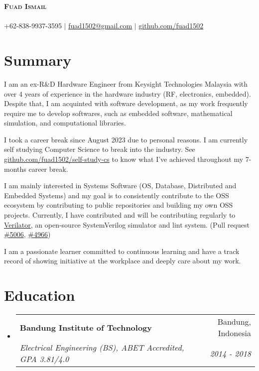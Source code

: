 \documentclass[letterpaper,11pt]{article}
\makeatletter
\newcommand{\resumeSubheading}[4]{
  \vspace{-2pt}\item
    \begin{tabular*}{0.97\textwidth}[t]{l@{\extracolsep{\fill}}r}
      \textbf{#1} & #2 \\
      \textit{\small#3} & \textit{\small #4} \\
    \end{tabular*}\vspace{-7pt}
}
\newcommand{\resumeSubHeadingListStart}{\begin{itemize}[leftmargin=0.15in, label={}]}
\newcommand{\resumeSubHeadingListEnd}{\end{itemize}}
\makeatother
\begin{document}
\begin{center}
  \textbf{\Huge \scshape Fuad Ismail} \\ \vspace{1pt}
  \small \textit{} \\
  +62-838-9937-3595 $|$ \href{mailto:fuad1502@gmail.com}{fuad1502@gmail.com} $|$ 
  \href{https://github.com/fuad1502}{github.com/fuad1502}
\end{center}

\section*{Summary}
\justifying
I am an ex-R\&D Hardware Engineer from Keysight Technologies Malaysia with over
4 years of experience in the hardware industry (RF, electronics, embedded).
Despite that, I am acquinted with software development, as my work frequently
require me to develop softwares, such as embedded software, mathematical
simulation, and computational libraries.

I took a career break since August 2023 due to personal reasons. I am currently
self studying Computer Science to break into the industry. See
\href{https://github.com/fuad1502/self-study-cs}{github.com/fuad1502/self-study-cs}
to know what I've achieved throughout my 7-months career break.

I am mainly interested in Systems Software (OS, Database, Distributed and
Embedded Systems) and my goal is to consistently contribute to the OSS
ecosystem by contributing to public repositories and building my own OSS
projects. Currently, I have contributed and will be contributing regularly to
\href{https://github.com/verilator/verilator}{Verilator}, an open-source
SystemVerilog simulator and lint system. (Pull request \href{https://github.com/verilator/verilator/pull/5006}{\#5006}, \href{https://github.com/verilator/verilator/pull/4966}{\#4966})

I am a passionate learner committed to continuous learning and have a track
record of showing initiative at the workplace and deeply care about my work.

\section{Education}
\resumeSubHeadingListStart
\resumeSubheading
  {Bandung Institute of Technology}{Bandung, Indonesia}
  {Electrical Engineering (BS), ABET Accredited, GPA
  3.81/4.0}{2014 - 2018}
\resumeSubHeadingListEnd
\end{document}
